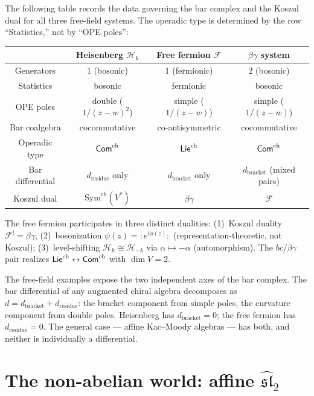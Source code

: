 The following table records the data governing the bar complex
and the Koszul dual for all three free-field systems.  The
operadic type is determined by the row ``Statistics,'' not by
``OPE poles'':
\begin{center}
\small
\begin{tabular}{c|c|c|c}
& \textbf{Heisenberg} $\mathcal{H}_k$ &
\textbf{Free fermion} $\mathcal{F}$ &
\textbf{$\beta\gamma$ system} \\
\hline
Generators & $1$ (bosonic) & $1$ (fermionic) & $2$ (bosonic) \\
Statistics & bosonic & fermionic & bosonic \\
OPE poles & double ($1/(z{-}w)^2$) & simple ($1/(z{-}w)$) &
  simple ($1/(z{-}w)$) \\
Bar coalgebra & cocommutative & co-antisymmetric &
  cocommutative \\
Operadic type & $\mathsf{Com}^{\mathrm{ch}}$ & $\mathsf{Lie}^{\mathrm{ch}}$ & $\mathsf{Com}^{\mathrm{ch}}$ \\
Bar differential & $d_{\mathrm{residue}}$ only
  & $d_{\mathrm{bracket}}$ only
  & $d_{\mathrm{bracket}}$ (mixed pairs) \\
Koszul dual & $\mathrm{Sym}^{\mathrm{ch}}(V^*)$
  & $\beta\gamma$ & $\mathcal{F}$ \\
\end{tabular}
\end{center}

\begin{remark}\label{rem:frame-three-dualities-intro}
The free fermion participates in three distinct dualities: (1)~Koszul duality $\mathcal{F}^! = \beta\gamma$; (2)~bosonization $\psi(z) = {:\!}e^{i\phi(z)}{:\!}$ (representation-theoretic, not Koszul); (3)~level-shifting $\mathcal{H}_k \cong \mathcal{H}_{-k}$ via $\alpha \mapsto -\alpha$ (automorphism).  The $bc$/$\beta\gamma$ pair realizes $\mathsf{Lie}^{\mathrm{ch}} \leftrightarrow \mathsf{Com}^{\mathrm{ch}}$ with $\dim V = 2$.
\end{remark}

The free-field examples expose the two independent axes of the
bar complex.  The bar differential of any augmented chiral
algebra decomposes as
$d = d_{\mathrm{bracket}} + d_{\mathrm{residue}}$: the
bracket component from simple poles, the curvature component
from double poles.  Heisenberg has $d_{\mathrm{bracket}} = 0$;
the free fermion has $d_{\mathrm{residue}} = 0$.
The general case --- affine Kac--Moody algebras --- has both,
and neither is individually a differential.

\section{\texorpdfstring{The non-abelian world: affine $\widehat{\mathfrak{sl}}_2$}{The non-abelian world: affine sl2}}
\label{sec:frame-nonabelian-preview}

